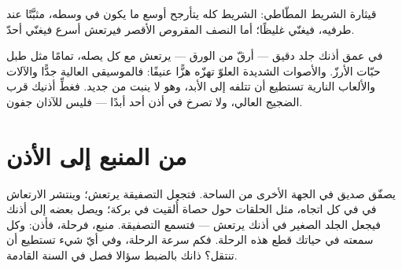 \begin{omfigure}

{\small قيثارة الشريط المطّاطي: الشريط كله يتأرجح أوسع ما يكون
في وسطه، مثبَّتًا عند طرفيه، فيغنّي غليظًا؛ أما النصف المقروص
الأقصر فيرتعش أسرع فيغنّي أحدّ.}
\end{omfigure}

\begin{remark}\label{rem:g3:sound-around-us:ears}
في عمق أذنك جلد دقيق --- أرقّ من الورق --- يرتعش مع كل 
يصله، تمامًا مثل طبل حبّات الأرزّ. والأصوات الشديدة العلوّ تهزّه
هزًّا عنيفًا: فالموسيقى العالية جدًّا والآلات والألعاب النارية
تستطيع أن تتلفه إلى الأبد، وهو لا ينبت من جديد. فغطِّ أذنيك قرب
الضجيج العالي، ولا تصرخ في أذن أحد أبدًا --- فليس للآذان
جفون.
\end{remark}

\section{من المنبع إلى الأذن}

\begin{example}\label{ex:g3:sound-around-us:journey}
يصفّق صديق في الجهة الأخرى من الساحة. فتجعل التصفيقة 
يرتعش؛ وينتشر الارتعاش في  في كل اتجاه، مثل الحلقات حول
حصاة أُلقيت في بركة؛ ويصل بعضه إلى أذنك فيجعل الجلد الصغير في
أذنك يرتعش --- فتسمع التصفيقة. منبع، فرحلة، فأذن: وكل  سمعته
في حياتك قطع هذه الرحلة. فكم سرعة الرحلة، وفي أيّ شيء تستطيع أن
تنتقل؟ ذانك بالضبط سؤالا فصل  في السنة القادمة.
\end{example}


